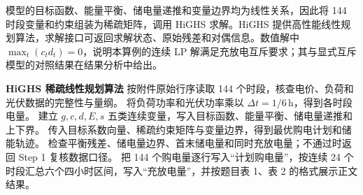 模型的目标函数、能量平衡、储电量递推和变量边界均为线性关系，因此将 144 时段变量和约束组装为稀疏矩阵，调用 HiGHS 求解。HiGHS 提供高性能线性规划算法\cite{highs}，求解接口可返回求解状态、原始残差和对偶信息。数值解中 $\max_t(c_td_t)=0$，说明本算例的连续 LP 解满足充放电互斥要求；其与显式互斥模型的对照结果在结果分析中给出。

\noindent\textbf{HiGHS 稀疏线性规划算法}
\algorithmstart
{}
按附件原始行序读取 144 个时段，核查电价、负荷和光伏数据的完整性与量纲。
将负荷功率和光伏功率乘以 $\Delta t=1/6\,\mathrm{h}$，得到各时段电量。
建立 $g,c,d,E,s$ 五类连续变量，写入目标函数、能量平衡、储电量递推和上下界。
传入目标系数向量、稀疏约束矩阵与变量边界，得到最优购电计划和储能轨迹。
检查平衡残差、储电量边界、首末储电量和同时充放电量；不通过时返回 Step 1 复核数据口径。
把 144 个购电量逐行写入“计划购电量”，按连续 24 个时段汇总六个四小时区间，写入“充放电量”，并按题目表 1、表 2 的格式展示正文结果。
\algorithmend
